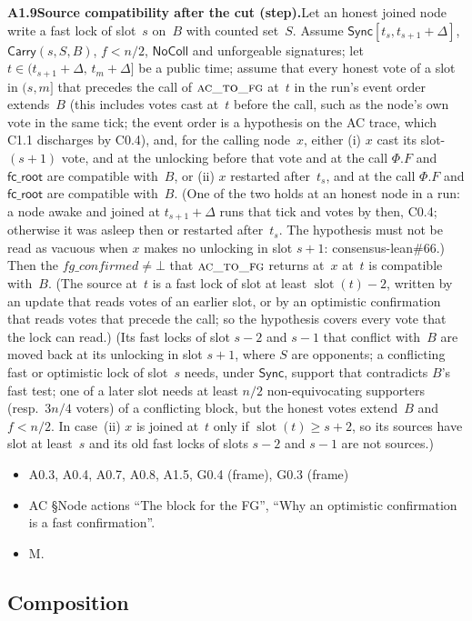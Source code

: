 \documentclass{article}
\newcommand{\slot}{\operatorname{slot}}
\newcommand{\Fr}{\Phi}
\newcommand{\fcroot}{\mathsf{fc\_root}}
\newcommand{\fname}[1]{\text{\textsc{#1}}}
\newcommand{\dagnode}[6]{%
\par\medskip\noindent\textbf{#1\enspace #2.}\enspace #3
\begin{itemize}[leftmargin=2.2em,itemsep=0pt,topsep=2pt]
\item[\emph{Uses}] #4
\item[\emph{Evid.}] #5
\item[\emph{Task}] #6
\end{itemize}}
\begin{document}
\dagnode{A1.9}{Source compatibility after the cut (step)}{Let an honest joined
node write a fast lock of slot~$s$ on~$B$ with counted set~$S$.  Assume
$\mathsf{Sync}[t_s,t_{s+1}+\Delta]$, $\mathsf{Carry}(s,S,B)$, $f<n/2$,
$\mathsf{NoColl}$ and unforgeable signatures; let $t\in(t_{s+1}+\Delta,\,
t_m+\Delta]$ be a public time; assume that every honest vote of a slot in
$(s,m]$ that precedes the call of $\fname{ac\_to\_fg}$ at~$t$ in the run's
event order extends~$B$ (this includes votes cast at~$t$ before the call, such
as the node's own vote in the same tick; the event order is a hypothesis on the
AC trace, which C1.1 discharges by C0.4), and, for the calling node~$x$,
either (i) $x$ cast its slot-$(s+1)$ vote, and at the unlocking before that vote
and at the call $\Fr.F$ and $\fcroot$ are compatible with~$B$, or (ii) $x$
restarted after~$t_s$, and at the call $\Fr.F$ and $\fcroot$ are compatible
with~$B$.  (One of the two holds at an honest node in a run: a node awake and
joined at $t_{s+1}+\Delta$ runs that tick and votes by then, C0.4; otherwise it
was asleep then or restarted after~$t_s$.  The hypothesis must not be read as
vacuous when $x$ makes no unlocking in slot $s+1$: consensus-lean\#66.)  Then the $\mathit{fg\_confirmed}\neq\bot$ that
$\fname{ac\_to\_fg}$ returns at~$x$ at~$t$ is compatible with~$B$.
(The source at~$t$ is a fast lock of slot at least $\slot(t)-2$, written by an
update that reads votes of an earlier slot, or by an optimistic confirmation
that reads votes that precede the call; so the hypothesis covers every vote
that the lock can read.)  (Its fast
locks of slot $s-2$ and $s-1$ that conflict with~$B$ are moved back at its
unlocking in slot $s+1$, where $S$ are opponents; a conflicting fast or
optimistic lock of slot~$s$ needs, under $\mathsf{Sync}$, support that
contradicts $B$'s fast test; one of a later slot needs at least $n/2$
non-equivocating supporters (resp.\ $3n/4$ voters) of a conflicting block,
but the honest votes extend~$B$ and $f<n/2$.  In case~(ii) $x$ is joined at~$t$
only if $\slot(t)\geq s+2$, so its sources have slot at least~$s$ and its old
fast locks of slots $s-2$ and $s-1$ are not sources.)}
{A0.3, A0.4, A0.7, A0.8, A1.5, G0.4 (frame), G0.3 (frame)}{AC \S Node actions ``The block for the FG'', ``Why
an optimistic confirmation is a fast confirmation''.}{M.}

\subsection{Composition}
\end{document}
